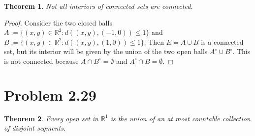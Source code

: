 \documentclass[psamsfonts]{amsart}
\newtheorem{thm}{Theorem}[section]
\theoremstyle{definition}
\theoremstyle{remark}
\numberwithin{equation}{section}
\begin{document}
\begin{thm}
Not all interiors of connected sets are connected. 
\end{thm}

\begin{proof}
Consider the two closed balls $A := \{ (x,y) \in \mathbb{R}^2 : d((x,y),(-1,0)) \leq 1 \}$ and $B := \{ (x,y) \in \mathbb{R}^2: d((x,y), (1,0)) \leq 1 \}$. Then $E = A \cup B$ is a connected set, but its interior will be given by the union of the two open balls $A^\circ \cup B^\circ$. This is not connected because $A \cap B^\circ = \emptyset$ and $A^\circ \cap B = \emptyset$. 
\end{proof}

\section{Problem 2.29}

\begin{thm}
Every open set in $\mathbb{R}^1$ is the union of an at most countable collection of disjoint segments.
\end{thm}
\end{document}
